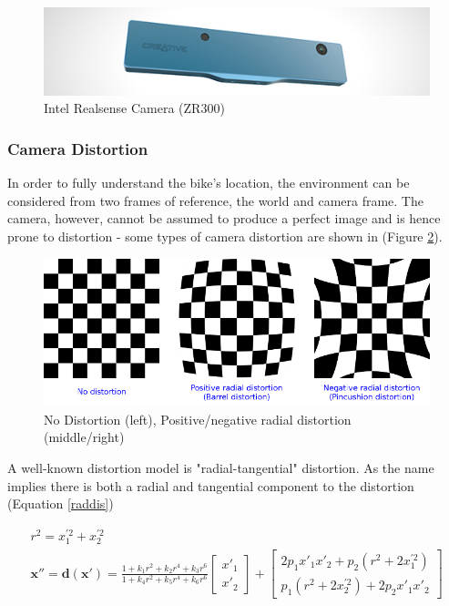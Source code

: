 \documentclass[a4paper,11pt,notitlepage]{article}
\begin{document}
\noindent \begin{figure}[h!]
\includegraphics[width = 1.0\hsize]{./figures/intel_realsense.jpg}
\caption{Intel Realsense Camera (ZR300)}
\label{realsense_camera}
\end{figure}

\subsubsection{Camera Distortion}
In order to fully understand the bike's location, the environment can be considered from two frames of reference, the world and camera frame. The camera, however, cannot be assumed to produce a perfect image and is hence prone to distortion - some types of camera distortion are shown in (Figure \ref{distortion}).


\noindent \begin{figure}[h!]
	\includegraphics[width = 1\hsize]{figures/distortion_example.png} 
	\caption{No Distortion (left)\cite{opencv_camera_article}, Positive/negative radial distortion (middle/right)}
	\label{distortion}
\end{figure}

A well-known distortion model is "radial-tangential" distortion. As the name implies there is both a radial and tangential component to the distortion (Equation \ref{raddis}) 

\begin{equation}
\begin{aligned}
r^{2} = x_{1}^{'2} + x_{2}^{'2} \\
\mathbf{x''} = \mathbf{d(x')} = \frac{1 + k_{1}r^{2} + k_{2}r^{4}+k_{3}r^{6}}{1+ k_{4}r^{2} + k_{5}r^{4}+k_{6}r^{6}}
\begin{bmatrix}
x'_{1} \\[0.3em]
x'_{2}
\end{bmatrix}
+ 
\begin{bmatrix}
2p_{1}x'_{1}x'_{2} + p_{2}(r^{2} + 2x_{1}^{'2}) \\[0.3em]
p_{1}(r^{2} + 2x_{2}^{'2}) + 2p_{2}x'_{1}x'_{2}
\end{bmatrix}
\end{aligned}
\label{raddis}
\end{equation}
\end{document}
